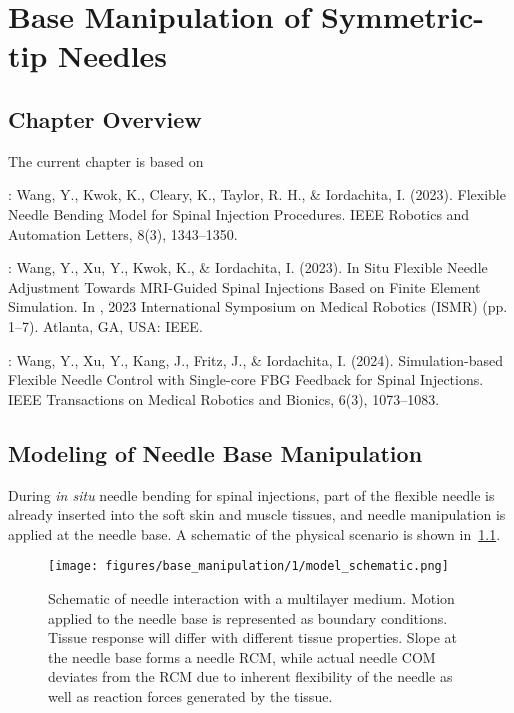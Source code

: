 \chapter{Base Manipulation of Symmetric-tip Needles} \label{chap:chap-3}

\section{Chapter Overview}
\label{sec:chap-3-overview}

The current chapter is based on

\parencite{wangFlexibleNeedleBending2023}: Wang, Y., Kwok, K., Cleary, K., Taylor, R. H., \& Iordachita, I. (2023). Flexible Needle Bending Model for Spinal Injection Procedures. IEEE Robotics and Automation Letters, 8(3), 1343–1350.

\parencite{wangSituFlexibleNeedle2023}: Wang, Y., Xu, Y., Kwok, K., \& Iordachita, I. (2023). In Situ Flexible Needle Adjustment Towards MRI-Guided Spinal Injections Based on Finite Element Simulation. In , 2023 International Symposium on Medical Robotics (ISMR) (pp. 1–7). Atlanta, GA, USA: IEEE.

\parencite{wangSimulationbasedFlexibleNeedle2024}: Wang, Y., Xu, Y., Kang, J., Fritz, J., \& Iordachita, I. (2024). Simulation-based Flexible Needle Control with Single-core FBG Feedback for Spinal Injections. IEEE Transactions on Medical Robotics and Bionics, 6(3), 1073–1083. 



\section{Modeling of Needle Base Manipulation}
\label{sec:chap-3-model}

During \textit{in situ} needle bending for spinal injections, part of the flexible needle is already inserted into the soft skin and muscle tissues, and needle manipulation is applied at the needle base. A schematic of the physical scenario is shown in~\cref{fig:chap-3-model-schematic}.

\begin{figure}[t]
  \centering
  \texttt{[image: figures/base\_manipulation/1/model\_schematic.png]}
  \caption{Schematic of needle interaction with a multilayer medium. Motion applied to the needle base is represented as boundary conditions. Tissue response will differ with different tissue properties. Slope at the needle base forms a needle RCM, while actual needle COM deviates from the RCM due to inherent flexibility of the needle as well as reaction forces generated by the tissue.}
  \label{fig:chap-3-model-schematic}
\end{figure}

